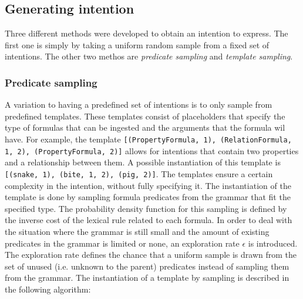 \documentclass[a4paper]{article}
\begin{document}
\subsection{Generating intention}
Three different methods were developed to obtain an intention to express. The first one is simply by taking a uniform random sample from a fixed set of intentions. The other two methos are \emph{predicate sampling} and \emph{template sampling}.
\subsubsection{Predicate sampling}
\label{sec:predicate_sampling}
A variation to having a predefined set of intentions is to only sample from predefined templates. These templates consist of placeholders that specify the type of formulas that can be ingested and the arguments that the formula wil have. For example, the template \verb|[(PropertyFormula, 1), (RelationFormula, 1, 2), (PropertyFormula, 2)]| allows for intentions that contain two properties and a relationship between them. A possible instantiation of this template is \verb|[(snake, 1), (bite, 1, 2), (pig, 2)]|. The templates ensure a certain complexity in the intention, without fully specifying it. The instantiation of the template is done by sampling formula predicates from the grammar that fit the specified type. The probability density function for this sampling is defined by the inverse cost of the lexical rule related to each formula. In order to deal with the situation where the grammar is still small and the amount of existing predicates in the grammar is limited or none, an exploration rate $\epsilon$ is introduced. The exploration rate defines the chance that a uniform sample is drawn from the set of unused (i.e. unknown to the parent) predicates instead of sampling them from the grammar. The instantiation of a template by sampling is described in the following algorithm:
\end{document}
